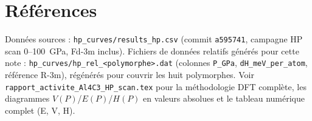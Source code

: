 \documentclass[11pt,a4paper]{article}
\begin{document}
\appendix
\section{Références}

Données sources : \texttt{hp\_curves/results\_hp.csv} (commit \texttt{a595741}, campagne HP
scan 0--100~GPa, Fd-3m inclus). Fichiers de données relatifs générés pour cette note :
\texttt{hp\_curves/hp\_rel\_<polymorphe>.dat} (colonnes \texttt{P\_GPa},
\texttt{dH\_meV\_per\_atom}, référence R-3m), régénérés pour couvrir les huit polymorphes. Voir
\texttt{rapport\_activite\_Al4C3\_HP\_scan.tex} pour la méthodologie DFT complète, les
diagrammes $V(P)$/$E(P)$/$H(P)$ en valeurs absolues et le tableau numérique complet (E, V, H).
\end{document}
